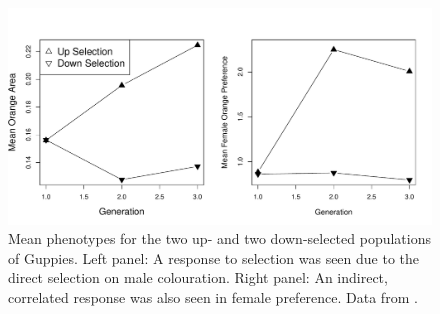 \begin{figure}
\begin{center}
\includegraphics[width=\textwidth]{Journal_figs/Quant_gen/guppies_female_choice/guppies_female_choice.pdf}
\end{center} \label{fig:assort_mating_guppies}
\caption{Mean phenotypes for the two up- and two down-selected
  populations of Guppies. Left panel: A response to selection was seen
  due to the direct selection on male colouration. Right panel: An
  indirect, correlated response was also seen in female
  preference. Data from \citet{houde:94}. }
\end{figure}

